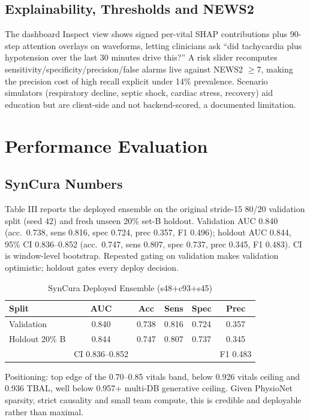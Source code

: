 \documentclass[a4paper,conference]{IEEEtran}
\begin{document}
\subsection{Explainability, Thresholds and NEWS2}
The dashboard Inspect view shows signed per-vital SHAP contributions plus 90-step attention overlays on waveforms, letting clinicians ask ``did tachycardia plus hypotension over the last 30 minutes drive this?'' A risk slider recomputes sensitivity/specificity/precision/false alarms live against NEWS2 $\ge$7, making the precision cost of high recall explicit under 14\% prevalence. Scenario simulators (respiratory decline, septic shock, cardiac stress, recovery) aid education but are client-side and not backend-scored, a documented limitation.

\section{Performance Evaluation}
\subsection{SynCura Numbers}
Table III reports the deployed ensemble on the original stride-15 80/20 validation split (seed 42) and fresh unseen 20\% set-B holdout. Validation AUC 0.840 (acc.\ 0.738, sens 0.816, spec 0.724, prec 0.357, F1 0.496); holdout AUC 0.844, 95\% CI 0.836--0.852 (acc.\ 0.747, sens 0.807, spec 0.737, prec 0.345, F1 0.483). CI is window-level bootstrap. Repeated gating on validation makes validation optimistic; holdout gates every deploy decision.

\begin{table}[htbp]
\caption{SynCura Deployed Ensemble (s48+c93+s45)}
\label{tab:res}
\centering
\footnotesize
\setlength{\tabcolsep}{4pt}
\begin{tabular}{lccccc}
\toprule
Split & AUC & Acc & Sens & Spec & Prec \\
\midrule
Validation & 0.840 & 0.738 & 0.816 & 0.724 & 0.357 \\
Holdout 20\% B & 0.844 & 0.747 & 0.807 & 0.737 & 0.345 \\
& CI 0.836--0.852 & & & & F1 0.483 \\
\bottomrule
\end{tabular}
\end{table}

Positioning: top edge of the 0.70--0.85 vitals band, below 0.926 vitals ceiling and 0.936 TBAL, well below 0.957+ multi-DB generative ceiling. Given PhysioNet sparsity, strict causality and small team compute, this is credible and deployable rather than maximal.
\end{document}
